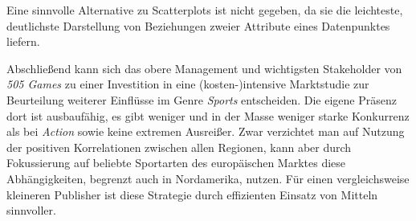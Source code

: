 \documentclass[usegeometry=true]{scrartcl}
\begin{document}

Eine sinnvolle Alternative zu Scatterplots ist nicht gegeben, 
da sie die leichteste, deutlichste Darstellung von Beziehungen zweier Attribute eines Datenpunktes liefern. 

Abschließend kann sich das obere Management und wichtigsten Stakeholder von \textit{505 Games}
zu einer Investition in eine (kosten-)intensive Marktstudie zur Beurteilung weiterer Einflüsse im Genre \textit{Sports} entscheiden. 
Die eigene Präsenz dort ist ausbaufähig, es gibt weniger und in der Masse weniger starke Konkurrenz als bei \textit{Action} sowie keine extremen Ausreißer.
Zwar verzichtet man auf Nutzung der positiven Korrelationen zwischen allen Regionen, kann aber durch Fokussierung auf beliebte Sportarten des europäischen Marktes diese Abhängigkeiten, begrenzt auch in Nordamerika, nutzen.   
Für einen vergleichsweise kleineren Publisher ist diese Strategie durch effizienten Einsatz von Mitteln sinnvoller.
 
\end{document}
